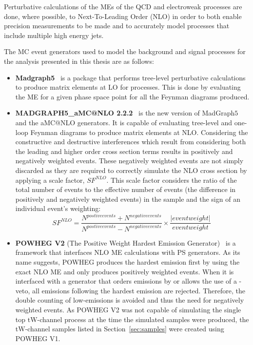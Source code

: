Perturbative calculations of the MEs of the QCD and electroweak processes are done, where possible, to Next-To-Leading Order (NLO) in order to both enable precision measurements to be made and to accurately model processes that include multiple high energy jets.

The MC event generators used to model the background and signal processes for the analysis presented in this thesis are as follows:

\begin{itemize}
\item \textbf{Madgraph5}~\cite{Alwall:2011uj} is a package that performs tree-level perturbative calculations to produce matrix elements at LO for processes.
This is done by evaluating the ME for a given phase space point for all the Feynman diagrams produced.
\item \textbf{MADGRAPH5\_aMC@NLO 2.2.2}~\cite{Alwall:2014hca} is the new version of MadGraph$5$ and the aMC@NLO generators.
It is capable of evaluating tree-level and one-loop Feynman diagrams to produce matrix elements at NLO.
Considering the constructive and destructive interferences which result from considering both the leading and higher order cross section terms results in positively and negatively weighted events.
These negatively weighted events are not simply discarded as they are required to correctly simulate the NLO cross section by applying a scale factor, $SF^{NLO}$.
This scale factor considers the ratio of the total number of events to the effective number of events (\ie the difference in positively and negatively weighted events) in the sample and the sign of an individual event's weighting:
\begin{equation}
SF^{NLO} = \frac{N^{postive events} + N^{negative events}}{N^{postive events} - N^{negative events}} \times \frac{|event weight|}{event weight} \;
\end{equation}

\item \textbf{POWHEG V2} (The Positive Weight Hardest Emission Generator)~\cite{Alioli:2010xd} is a framework that interfaces NLO ME calculations with PS generators.
As its name suggests, POWHEG produces the hardest emission first by using the exact NLO ME and only produces positively weighted events.
When it is interfaced with a generator that orders emissions by \pT or allows the use of a \pT-veto, all emissions following the hardest emission are rejected.
Therefore, the double counting of low-\pT emissions is avoided and thus the need for negatively weighted events.
As POWHEG V2 was not capable of simulating the single top tW-channel process at the time the simulated samples were produced, the tW-channel samples listed in Section~\ref{sec:samples} were created using POWHEG V1.


\end{itemize}
